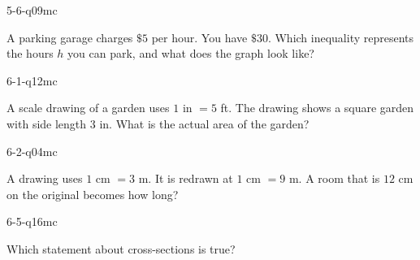 \begin{practiceQuestion}{5-6-q09}{mc}
\begin{questionText}
A parking garage charges $\$5$ per hour. You have $\$30$. Which inequality represents the hours $h$ you can park, and what does the graph look like?
\end{questionText}
\end{practiceQuestion}

\begin{practiceQuestion}{6-1-q12}{mc}
\begin{questionText}
A scale drawing of a garden uses $1$ in $= 5$ ft. The drawing shows a square garden with side length $3$ in. What is the actual area of the garden?
\end{questionText}
\end{practiceQuestion}

\begin{practiceQuestion}{6-2-q04}{mc}
\begin{questionText}
A drawing uses $1$ cm $= 3$ m. It is redrawn at $1$ cm $= 9$ m. A room that is $12$ cm on the original becomes how long?
\end{questionText}
\end{practiceQuestion}

\begin{practiceQuestion}{6-5-q16}{mc}
\begin{questionText}
Which statement about cross-sections is true?
\end{questionText}
\end{practiceQuestion}


